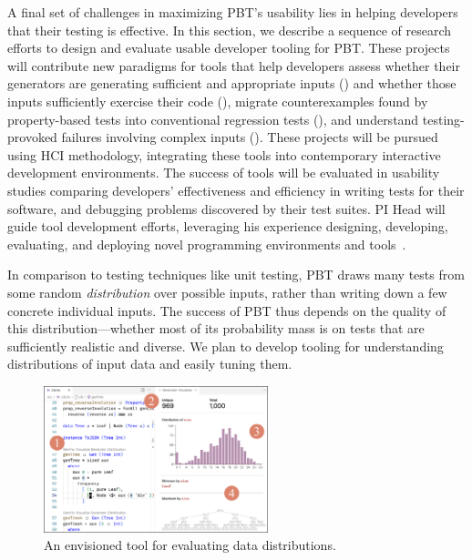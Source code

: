 


A final set of challenges in maximizing PBT's usability lies in
helping developers
 that their testing is effective. In this section, we
describe a sequence of research efforts to design and evaluate usable developer
tooling for PBT. These projects will contribute new paradigms for tools that
help developers assess whether their generators are generating sufficient and
appropriate inputs () and whether those
inputs sufficiently exercise their code (), migrate
counterexamples found by property-based tests into conventional regression tests (),
and understand testing-provoked failures involving complex inputs
(). These projects will be pursued using HCI
methodology, integrating these tools into contemporary interactive development
environments. The success of tools will be evaluated in usability studies
comparing developers' effectiveness and efficiency in writing tests for their
software, and debugging problems discovered by their test suites.  PI Head will
guide tool development efforts, leveraging his
experience designing, developing, evaluating, and deploying novel programming
environments and
tools~\cite{ref:head2015tutorons,ref:suzuki2017tracediff,ref:head2017writing,ref:head2018when,ref:head2018interactive,ref:head2019managing,ref:head2020composing}.

%
In comparison to testing techniques like unit testing, PBT draws many
tests from some
random {\em distribution} over possible inputs, rather than writing down a few
concrete individual inputs. The success  of
PBT thus depends on the quality of this distribution---whether
most of its probability mass is on tests that are sufficiently
realistic and diverse. We plan
to develop tooling for
understanding distributions of input data and easily tuning them.

\begin{figure}
  \centering
  \includegraphics[width=0.58\textwidth]{assets/gen-vis.pdf}
  \caption{An envisioned tool for evaluating data distributions.
    }\label{fig:gen-vis}
\end{figure}

